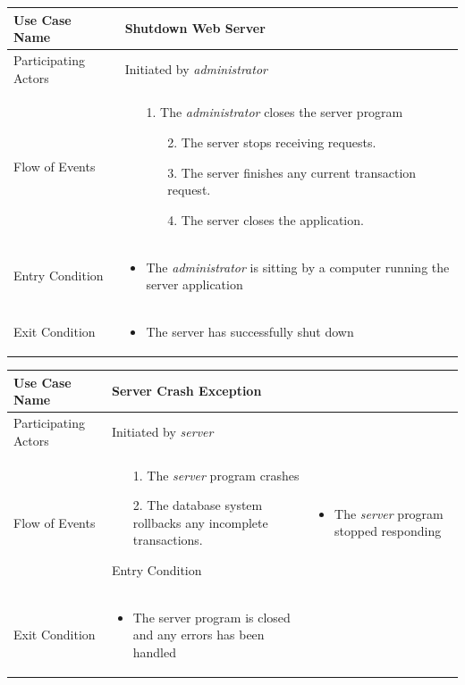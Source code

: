 \begin{center}
	\begin{tabular}{ | l | p{10cm} |  }
		 \hline
		Use Case Name & Shutdown Web Server \\ \hline
		Participating Actors & Initiated by \emph{administrator} \\ \hline
		Flow of Events & \begin{enumerate}
						\item[1.] The \emph{administrator} closes the server program
						\begin{enumerate}
							\item[2.] The server stops receiving requests.
							\item[3.] The server finishes any current transaction request.
							\item[4.] The server closes the application.			 
						\end{enumerate}
					\end{enumerate} \\ \hline
		Entry Condition & \begin{itemize}
						\item The \emph{administrator} is sitting by a computer running the server application
					\end{itemize} \\ \hline
		Exit Condition & \begin{itemize}
						\item The server has successfully shut down
					\end{itemize} \\
		\hline
	\end{tabular}
\end{center}

\begin{center}
	\begin{tabular}{ | l | p{10cm} |  }
		 \hline
		Use Case Name & Server Crash Exception \\ \hline
		Participating Actors & Initiated by \emph{server} \\ \hline
		Flow of Events & \begin{enumerate}
						\item[1.] The \emph{server} program crashes
						\item[2.] The database system rollbacks any incomplete transactions.
						\end{enumerate}
		Entry Condition & \begin{itemize}
						\item The \emph{server} program stopped responding
					\end{itemize} \\ \hline
		Exit Condition & \begin{itemize}
						\item The server program is closed and any errors has been handled
					\end{itemize} \\
		\hline
	\end{tabular}
\end{center}

